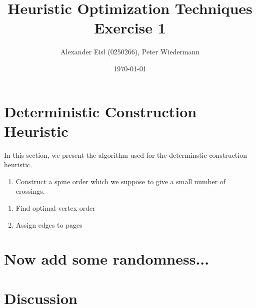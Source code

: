 \documentclass{scrartcl}
\author{Alexander Eisl (0250266), Peter Wiedermann}
\date{\today}
\title{Heuristic Optimization Techniques \\ Exercise 1}
\begin{document}
\maketitle


\section{Deterministic Construction Heuristic}
In this section, we present the algorithm used for the determinstic
construction heuristic. 

\begin{enumerate}
  \item Construct a spine order which we suppose to give a small number 
    of crossings.
\end{enumerate}



\begin{enumerate}
  \item Find optimal vertex order
  \item Assign edges to pages
\end{enumerate}


\section{Now add some randomness...}


\section{Discussion}
\end{document}
